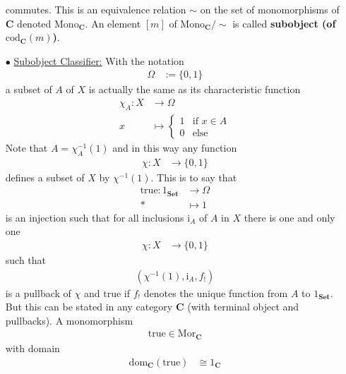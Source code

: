 \begin{exa}
\begin{enumerate}
\[\]
commutes. This is an equivalence relation $\sim$ on the set of monomorphisms of $\mathbf{C}$ denoted $\mathrm{Mono}_{\mathbf{C}}$. An element $[m]$ of $\mathrm{Mono}_{\mathbf{C}} \slash \sim$ is called \textbf{subobject (of $\mathrm{cod}_{\mathbf{C}}(m)$)}.
\item[$\bullet$]
\underline{Subobject Classifier:}
With the notation
\begin{align*}
  \Omega
  &:=
  \lbrace
    0,
    1
  \rbrace
\end{align*}
a subset of $A$ of $X$ is actually the same as its characteristic function
\begin{align*}
  \chi_{A}
  \colon
  X
  &\rightarrow
  \Omega
  \\
  x
  &\mapsto
  \begin{cases}
    1
    &
    \text{if }
    x
    \in
    A
    \\
    0
    &
    \text{else}
  \end{cases}
\end{align*}
Note that $A = \chi_{A}^{-1}(1)$ and in this way any function
\begin{align*}
  \chi
  \colon
  X
  &\rightarrow
  \lbrace
    0,
    1
  \rbrace
\end{align*}
defines a subset of $X$ by $\chi^{-1}(1)$. This is to say that
\begin{align*}
  \mathrm{true}
  \colon
  1_{\mathbf{Set}}
  &\rightarrow
  \Omega
  \\
  \ast
  &\mapsto
  1
\end{align*}
is an injection such that for all inclusions $\mathrm{i}_{A}$ of $A$ in $X$ there is one and only one
\begin{align*}
  \chi
  \colon
  X
  &\rightarrow
  \lbrace
    0,
    1
  \rbrace
\end{align*}
such that
\begin{align*}
  \left(
    \chi^{-1}(1),
    \mathrm{i}_{A},
    f_{!}
  \right)
\end{align*}
is a pullback of $\chi$ and $\mathrm{true}$ if $f_{!}$ denotes the unique function from $A$ to $1_{\mathbf{Set}}$. But this can be stated in any category $\mathbf{C}$ (with terminal object and pullbacks). A monomorphism
\begin{align*}
  \mathrm{true}
  \in
  \mathrm{Mor}_{\mathbf{C}}
\end{align*}
with domain
\begin{align*}
  \mathrm{dom}_{\mathbf{C}}(\mathrm{true})
  &\cong
  1_{\mathbf{C}}
\end{align*}

\end{enumerate}
\end{exa}
